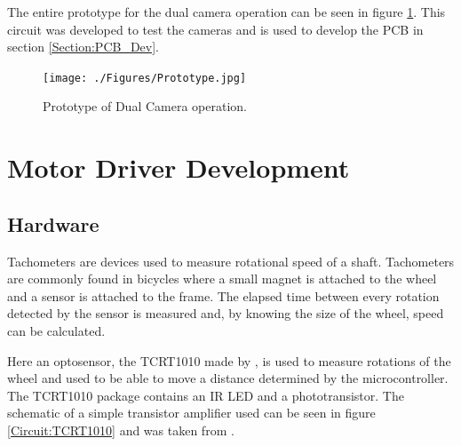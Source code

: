 The entire prototype for the dual camera operation can be seen in figure \ref{fig:Prototype}. This circuit was developed to test the cameras and is used to develop the PCB in section \ref{Section:PCB_Dev}. 
\begin{figure}
\texttt{[image: ./Figures/Prototype.jpg]}
\caption{Prototype of Dual Camera operation.}
\label{fig:Prototype}
\end{figure}
\section{Motor Driver Development}\label{Section:Motor_Dev}

\subsection{Hardware}
Tachometers are devices used to measure rotational speed of a shaft. Tachometers are commonly found in bicycles where a small magnet is attached to the wheel and a sensor is attached to the frame. The elapsed time between every rotation detected by the sensor is measured and, by knowing the size of the wheel, speed can be calculated. 

Here an optosensor, the TCRT1010 made by \cite{Vishay:TCRT1010:Datasheet}, is used to measure rotations of the wheel and used to be able to move a distance determined by the microcontroller. The TCRT1010 package contains an IR LED and a phototransistor. The schematic of a simple transistor amplifier used can be seen in figure \ref{Circuit:TCRT1010} and was taken from \cite{NEEDED}. 

